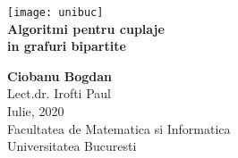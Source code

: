 \begin{titlepage}
  \vspace{1 in}
  \begin{center}
    \hspace{4in} \texttt{[image: unibuc]}
    \\
    \huge
    \textbf{Algoritmi pentru cuplaje \\ in grafuri bipartite} \\
    \vspace{0.8 in}

    \Large
    \textbf{Ciobanu Bogdan} \\
    Lect.dr. Irofti Paul \\

    \vspace*{\fill}
    Iulie, 2020 \\
    Facultatea de Matematica si Informatica\\
    Universitatea Bucuresti \\

  \end{center}
\end{titlepage}
